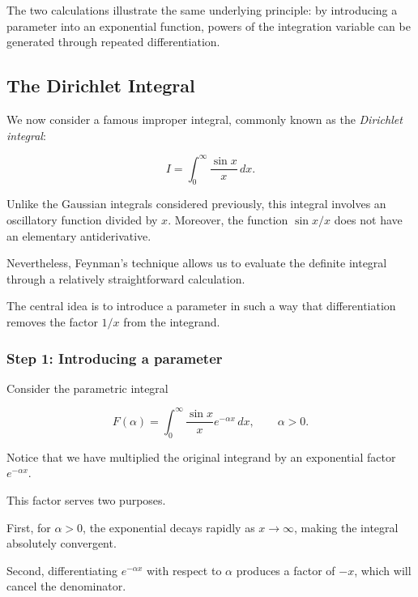 \documentclass[11pt,a4paper]{article}
\theoremstyle{definition}
\theoremstyle{remark}
\begin{document}
The two calculations illustrate
the same underlying principle:
by introducing a parameter into
an exponential function, powers
of the integration variable
can be generated through
repeated differentiation.


\subsection{The Dirichlet Integral}

We now consider a famous improper integral,
commonly known as the \emph{Dirichlet integral}:

\begin{equation}
    I =
    \int_0^\infty \frac{\sin x}{x}\,dx.
    \label{eq:dirichlet_integral}
\end{equation}

Unlike the Gaussian integrals considered
previously, this integral involves an
oscillatory function divided by $x$.
Moreover, the function $\sin x/x$ does
not have an elementary antiderivative.

Nevertheless, Feynman's technique allows
us to evaluate the definite integral
through a relatively straightforward
calculation.

The central idea is to introduce a
parameter in such a way that
differentiation removes the factor
$1/x$ from the integrand.

\subsubsection*{Step 1: Introducing a parameter}

Consider the parametric integral

\begin{equation}
    F(\alpha)
    =
    \int_0^\infty
    \frac{\sin x}{x}e^{-\alpha x}\,dx,
    \qquad \alpha>0.
    \label{eq:dirichlet_parameter}
\end{equation}

Notice that we have multiplied the
original integrand by an exponential
factor $e^{-\alpha x}$.

This factor serves two purposes.

First, for $\alpha>0$, the exponential
decays rapidly as $x\to\infty$,
making the integral absolutely
convergent.

Second, differentiating
$e^{-\alpha x}$ with respect to
$\alpha$ produces a factor of $-x$,
which will cancel the denominator.
\end{document}
